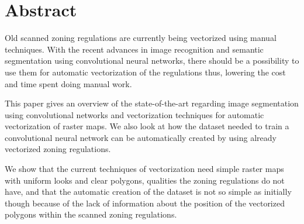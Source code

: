 \section*{Abstract}
Old scanned zoning regulations are currently being vectorized using manual techniques. With the recent advances in image recognition and semantic segmentation using convolutional neural networks, there should be a possibility to use them for automatic vectorization of the regulations thus, lowering the cost and time spent doing manual work.

This paper gives an overview of the state-of-the-art regarding image segmentation using convolutional networks and vectorization techniques for automatic vectorization of raster maps. We also look at how the dataset needed to train a convolutional neural network can be automatically created by using already vectorized zoning regulations.

We show that the current techniques of vectorization need simple raster maps with uniform looks and clear polygons, qualities the zoning regulations do not have, and that the automatic creation of the dataset is not so simple as initially though because of the lack of information about the position of the vectorized polygons within the scanned zoning regulations.